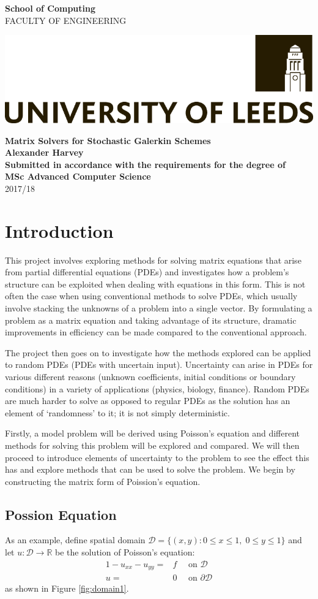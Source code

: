 \documentclass[11pt]{article}
\numberwithin{equation}{section}
\newcommand{\projectTitle}{Matrix Solvers for Stochastic Galerkin Schemes}
\newcommand{\fullname}{Alexander Harvey}
\newcommand{\degreeTitle}{MSc Advanced Computer Science}
\newcommand{\session}{2017/18}
\newcommand{\frontcover}{
\begin{titlepage}
\newgeometry{left=25mm,right=25mm,top=45mm,bottom=0.1cm}

\begin{minipage}[t]{7cm}
\noindent\textbf{\Large{School of Computing}}\\
{\fontfamily{ptm}\selectfont 
\uppercase{faculty of engineering}
}
\end{minipage}
\hfill
\begin{minipage}[t]{7cm}
\vspace*{-25pt}
\includegraphics[scale=0.2,right]{logo_black.png}
\vspace*{-1pt}
\end{minipage}

\noindent\makebox[\linewidth]{\rule{\paperwidth}{0.4pt}}

\centering
\vspace*{37mm}
\textbf{\Large\projectTitle}\\
\vspace*{10mm}
\textbf{\large\fullname}\\
\vspace*{10mm}
\textbf{Submitted in accordance with the requirements for the degree of}\\
\textbf{\degreeTitle}\\
\vspace*{10mm}
\session\\
\restoregeometry
\end{titlepage}
}
\begin{document}
\frontcover

\newpage


\tableofcontents

\clearpage


\section{Introduction}
This project involves exploring methods for solving matrix equations that arise from partial differential equations (PDEs) and investigates how a problem's structure can be exploited when dealing with equations in this form. This is not often the case when using conventional methods to solve PDEs, which usually involve stacking the unknowns of a problem into a single vector. By formulating a problem as a matrix equation and taking advantage of its structure, dramatic improvements in efficiency can be made compared to the conventional approach. 

The project then goes on to investigate how the methods explored can be applied to random PDEs (PDEs with uncertain input). Uncertainty can arise in PDEs for various different reasons (unknown coefficients, initial conditions or boundary conditions) in a variety of applications (physics, biology, finance). Random PDEs are much harder to solve as opposed to regular PDEs as the solution has an element of `randomness' to it; it is not simply deterministic. 

Firstly, a model problem will be derived using Poisson's equation and different methods for solving this problem will be explored and compared. We will then proceed to introduce elements of uncertainty to the problem to see the effect this has and explore methods that can be used to solve the problem. We begin by constructing the matrix form of Poission's equation.

\subsection{Possion Equation}
As an example, define spatial domain $\mathcal{D} = \{(x,y) : 0 \leq x \leq 1, \; 0 \leq y \leq 1 \}$ and let $u: \mathcal{D} \to \mathbb{R}$ be the solution of Poisson's equation:
	\begin{alignat}{1} 
	-u_{xx} - u_{yy} = {} & f \quad \text{ on } \mathcal{D} \nonumber \\
	u = {} & 0 \quad \text{ on } \partial \mathcal{D}
	\end{alignat}
as shown in Figure \ref{fig:domain1}.
\end{document}
